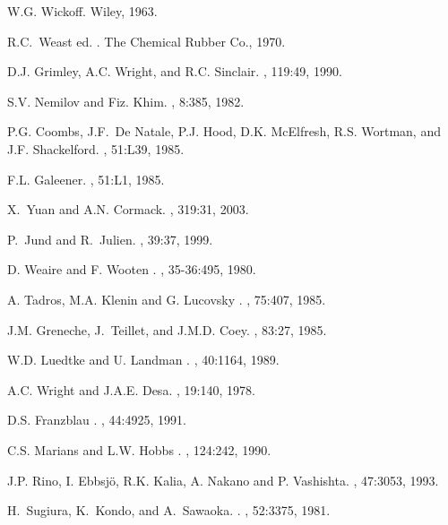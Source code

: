 \documentclass[aps,10pt,twocolumn]{revtex4}
\begin{document}
\begin{thebibliography}{10}
W.G. Wickoff.
\newblock Wiley, 1963.

R.C.~Weast ed.
.
\newblock The Chemical Rubber Co., 1970.

D.J. Grimley, A.C. Wright, and R.C. Sinclair.
, 119:49, 1990.

S.V. Nemilov and Fiz. Khim.
, 8:385, 1982.

P.G. Coombs, J.F.~De Natale, P.J. Hood, D.K. McElfresh, R.S. Wortman, and J.F.
  Shackelford.
, 51:L39, 1985.

F.L. Galeener.
, 51:L1, 1985.

X.~Yuan and A.N. Cormack.
, 319:31, 2003.

P.~Jund and R.~Julien.
, 39:37, 1999.

{ D. Weaire and F. Wooten }.
, 35-36:495, 1980.

{ A. Tadros, M.A. Klenin and G. Lucovsky }.
, 75:407, 1985.

J.M. Greneche, J.~Teillet, and J.M.D. Coey.
, 83:27, 1985.

{ W.D. Luedtke and U. Landman }.
, 40:1164, 1989.

{A.C. Wright and J.A.E. Desa}.
, 19:140, 1978.

{ D.S. Franzblau }.
, 44:4925, 1991.

{ C.S. Marians and L.W. Hobbs }.
, 124:242, 1990.

{J.P. Rino, I. Ebbsj\"o, R.K. Kalia, A. Nakano and P. Vashishta}.
, 47:3053, 1993.

H.~Sugiura, K.~Kondo, and A.~Sawaoka.
\newblock {}.
, 52:3375, 1981.


\end{thebibliography}
\end{document}
